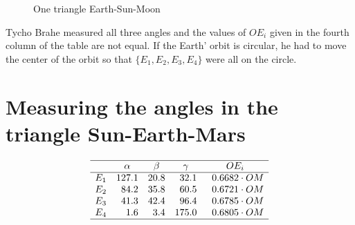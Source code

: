 \begin{figure}[t]
\begin{center}
\caption{One triangle Earth-Sun-Moon}\label{f.kepler-one-triangle}
\end{center}
\end{figure}


Tycho Brahe measured all three angles and the values of $OE_i$ given in the fourth column of the table are not equal. If the Earth' orbit is circular, he had to move the center of the orbit so that $\{E_1,E_2,E_3,E_4\}$ were all on the circle.

\section{Measuring the angles in the triangle Sun-Earth-Mars}


\begin{wrapfigure}[7]{R}{.5\textwidth}
\[
\begin{array}{rrrrr}
\hline
& \multicolumn{1}{c}{\alpha} & \multicolumn{1}{c}{\beta} &
  \multicolumn{1}{c}{\gamma} & \multicolumn{1}{c}{OE_i} \\\hline
E_1 & 127.1 & 20.8  & 32.1 & \;\; 0.6682\cdot OM\\
E_2 & 84.2 & 35.8 & 60.5 & \;\;0.6721\cdot OM\\
E_3 & 41.3 & 42.4 &96.4 & \;\;0.6785\cdot OM\\
E_4 & 1.6& 3.4& 175.0 & \;\;0.6805\cdot OM\\
\hline
\end{array}
\]
\end{wrapfigure}


